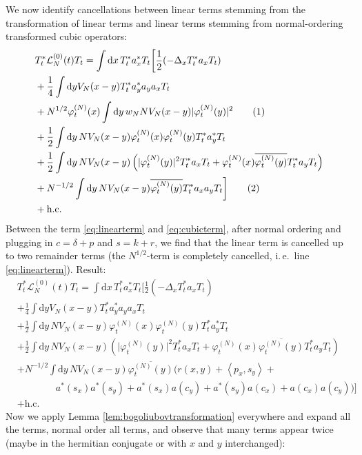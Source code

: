 \documentclass[11pt,a4paper,twoside,headsepline]{scrartcl}
\newcommand{\di}{\textrm{d}}		%
\newcommand{\Lcal}{\mathcal{L}}		%
\newcommand{\hc}{\mbox{h.c.}}		%
\newcommand{\scal}[2]{\left<#1,#2\right>} %
\newcommand{\cc}[1]{\overline{#1}}	%
\newcommand{\ph}{\varphi_t^{(N)}}	%
\newcommand{\tagg}[1]{ \stepcounter{equation} \tag{\theequation} \label{eq:#1} } %
\newcommand{\eqr}[1]{\eqref{eq:#1}}			%
\begin{document}
We now identify cancellations between linear terms stemming from the transformation of linear terms and linear terms stemming from normal-ordering transformed cubic operators:
\begin{align*}
& T^*_t \Lcal^{(0)}_N(t) T_t = \int \di x\, T^*_t a^*_x T_t \bigg[   \frac{1}{2}(-\Delta_x T^*_t a_x T_t) \\
& + \frac{1}{4}\int \di y V_N(x-y) T^*_t a^*_y a_y a_x T_t \\
& + N^{1/2} \ph(x) \int \di y\, w_N N V_N(x-y) \lvert \ph(y) \rvert^2 \tagg{linearterm} \\
& + \frac{1}{2} \int \di y\, NV_N(x-y)  \ph(x) \ph(y)  T^*_t a^*_y T_t \\
& + \frac{1}{2} \int \di y\, NV_N(x-y) \left(  \lvert \ph(y)\rvert^2 T^*_t a_x T_t + \ph(x) \cc{\ph(y)} T^*_t a_y T_t  \right) \\
& + N^{-1/2} \int \di y\, NV_N(x-y) \cc{\ph(y)} T^*_t a_x a_y T_t  \bigg]\tagg{cubicterm} \\
& + \hc
\end{align*}
Between the term \eqr{linearterm} and \eqr{cubicterm}, after normal ordering and plugging in $c = \delta + p$ and $s = k + r$, we find that the linear term is cancelled up to two remainder terms (the $N^{1/2}$-term is completely cancelled, i.\,e.\ line \eqr{linearterm}). Result:
\begin{align*}
& T^*_t \Lcal^{(0)}_N(t) T_t = \int \di x\, T^*_t a^*_x T_t \bigg[   \frac{1}{2}(-\Delta_x T^*_t a_x T_t) \\
& + \frac{1}{4}\int \di y V_N(x-y) T^*_t a^*_y a_y a_x T_t \\
& + \frac{1}{2} \int \di y\, NV_N(x-y)  \ph(x) \ph(y)  T^*_t a^*_y T_t \\
& + \frac{1}{2} \int \di y\, NV_N(x-y) \left(  \lvert \ph(y)\rvert^2 T^*_t a_x T_t + \ph(x) \cc{\ph(y)} T^*_t a_y T_t  \right) \\
& + N^{-1/2} \int \di y\, NV_N(x-y) \cc{\ph(y)} \bigg( r(x,y) + \scal{p_x}{s_y} + \\
& \qquad \qquad  a^*(s_x) a^*(s_y) + a^*(s_x) a(c_y)  + a^*(s_y) a(c_x) + a(c_x) a(c_y)  \bigg)  \bigg] \\
& + \hc
\end{align*}
Now we apply Lemma \ref{lem:bogoliubovtransformation} everywhere and expand all the terms, normal order all terms, and observe that many terms appear twice (maybe in the hermitian conjugate or with $x$ and $y$ interchanged):
\end{document}

